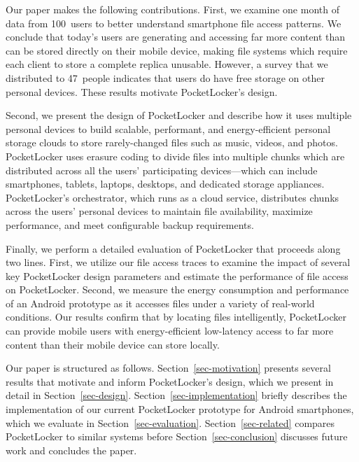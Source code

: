 Our paper makes the following contributions. First, we examine one month of
data from 100~users to better understand smartphone file access patterns. We
conclude that today's users are generating and accessing far more content
than can be stored directly on their mobile device, making file systems which
require each client to store a complete replica unusable. However, a survey
that we distributed to 47~people indicates that users do have free storage on
other personal devices. These results motivate PocketLocker's design.

Second, we present the design of PocketLocker and describe how it uses
multiple personal devices to build scalable, performant, and energy-efficient
personal storage clouds to store rarely-changed files such as music, videos,
and photos. PocketLocker uses erasure coding to divide files into multiple
chunks which are distributed across all the users' participating devices---which
can include smartphones, tablets, laptops, desktops, and dedicated storage
appliances. PocketLocker’s orchestrator, which runs as a cloud service,
distributes chunks across the users’ personal devices to maintain file
availability, maximize performance, and meet configurable backup
requirements.

Finally, we perform a detailed evaluation of PocketLocker that proceeds along
two lines. First, we utilize our file access traces to examine the impact of
several key PocketLocker design parameters and estimate the performance of
file access on PocketLocker. Second, we measure the energy consumption and
performance of an Android prototype as it accesses files under a variety of
real-world conditions. Our results confirm that by locating files
intelligently, PocketLocker can provide mobile users with energy-efficient
low-latency access to far more content than their mobile device can store
locally.

Our paper is structured as follows. Section~\ref{sec-motivation} presents
several results that motivate and inform PocketLocker's design, which we
present in detail in Section~\ref{sec-design}.
Section~\ref{sec-implementation} briefly describes the implementation of our
current PocketLocker prototype for Android smartphones, which we evaluate in
Section~\ref{sec-evaluation}. Section~\ref{sec-related} compares PocketLocker
to similar systems before Section~\ref{sec-conclusion} discusses future work
and concludes the paper.
